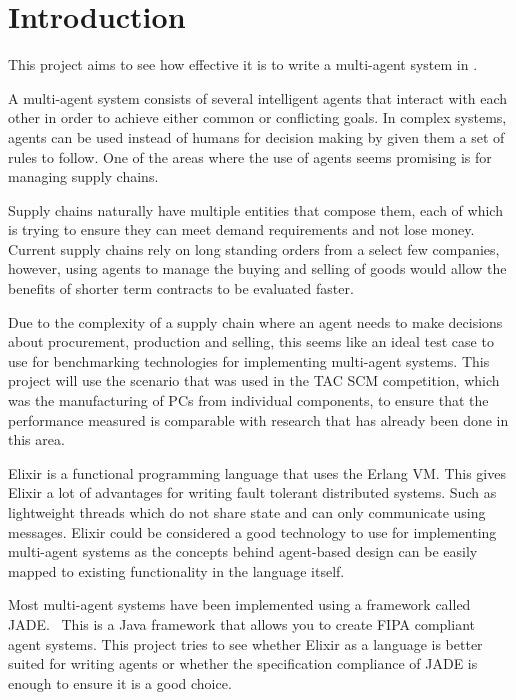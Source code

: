 \section{Introduction}

This project aims to see how effective it is to write a multi-agent system in .

A multi-agent system consists of several intelligent agents that interact with each other in order to achieve either common or conflicting goals.
In complex systems, agents can be used instead of humans for decision making by given them a set of rules to follow.
One of the areas where the use of agents seems promising is for managing supply chains.

Supply chains naturally have multiple entities that compose them, each of which is trying to ensure they can meet demand requirements and not lose money.
Current supply chains rely on long standing orders from a select few companies, however, using agents to manage the buying and selling of goods would allow the benefits of shorter term contracts to be evaluated faster.

Due to the complexity of a supply chain where an agent needs to make decisions about procurement, production and selling, this seems like an ideal test case to use for benchmarking technologies for implementing multi-agent systems.
This project will use the scenario that was used in the TAC SCM competition, which was the manufacturing of PCs from individual components, to ensure that the performance measured is comparable with research that has already been done in this area.

Elixir is a functional programming language that uses the Erlang VM\@.
This gives Elixir a lot of advantages for writing fault tolerant distributed systems.
Such as lightweight threads which do not share state and can only communicate using messages.
Elixir could be considered a good technology to use for implementing multi-agent systems as the concepts behind agent-based design can be easily mapped to existing functionality in the language itself.

Most multi-agent systems have been implemented using a framework called JADE\@.~\cite{bellifemine1999jade}
This is a Java framework that allows you to create FIPA compliant agent systems.
This project tries to see whether Elixir as a language is better suited for writing agents or whether the specification compliance of JADE is enough to ensure it is a good choice.

